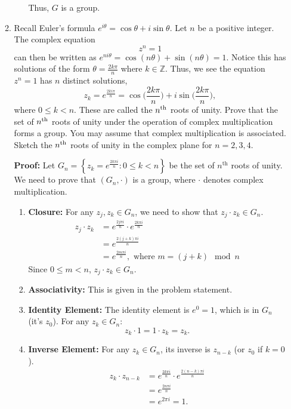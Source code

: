 \documentclass[10pt,twoside]{article}
\newcommand\Z{\mathbb{Z}}
\begin{document}
\begin{itemize}
\begin{enumerate}
\begin{enumerate}
\begin{solution}
                Thus, $G$ is a group.
            \end{solution}
		 \end{enumerate}
		\item Recall Euler's formula $e^{i \theta} = \cos \theta + i \sin \theta$. Let $n$ be a positive integer. The complex equation
		\[ z^n = 1\]
		can then be written as $e^{ni \theta} = \cos (n \theta) + \sin (n \theta) = 1$. Notice this has solutions of the form $\theta = \frac{2k \pi}{n}$ where $k \in \Z$. Thus, we see the equation $z^n =1$ has $n$ distinct solutions, 
		\[ z_k = e^{\frac{2k i \pi}{n}} = \cos \Big(\frac{2k \pi}{n}\Big) + i \sin \Big(\frac{2k \pi}{n}\Big), \]
where $0 \leq k < n$. These are called the $n^{\textup{th}}$ roots of unity. Prove that the set of $n^{\textup{th}}$ roots of unity under the operation of complex multiplication forms a group. You may assume that complex multiplication is associated. Sketch the $n^{\textup{th}}$ roots of unity in the complex plane for $n=2, 3, 4$.
	
   
       \textbf{Proof:}
Let \( G_n = \left\{ z_k = e^{\frac{2k\pi i}{n}} : 0 \leq k < n \right\} \) be the set of \( n^{\text{th}} \) roots of unity. We need to prove that \( (G_n, \cdot) \) is a group, where \( \cdot \) denotes complex multiplication.

\begin{enumerate}
\item \textbf{Closure:} For any \( z_j, z_k \in G_n \), we need to show that \( z_j \cdot z_k \in G_n \).
\begin{align*}
z_j \cdot z_k &= e^{\frac{2j\pi i}{n}} \cdot e^{\frac{2k\pi i}{n}} \\
&= e^{\frac{2(j+k)\pi i}{n}} \\
&= e^{\frac{2m\pi i}{n}}, \text{ where } m = (j+k) \mod n
\end{align*}
Since \( 0 \leq m < n \), \( z_j \cdot z_k \in G_n \).

\item \textbf{Associativity:} This is given in the problem statement.

\item \textbf{Identity Element:} The identity element is \( e^0 = 1 \), which is in \( G_n \) (it's \( z_0 \)). For any \( z_k \in G_n \):
\[
z_k \cdot 1 = 1 \cdot z_k = z_k.
\]

\item \textbf{Inverse Element:} For any \( z_k \in G_n \), its inverse is \( z_{n-k} \) (or \( z_0 \) if \( k=0 \)).
\begin{align*}
z_k \cdot z_{n-k} &= e^{\frac{2k\pi i}{n}} \cdot e^{\frac{2(n-k)\pi i}{n}} \\
&= e^{\frac{2n\pi i}{n}} \\
&= e^{2\pi i} = 1.
\end{align*}


\end{enumerate}
\end{enumerate}
\end{itemize}
\end{document}

